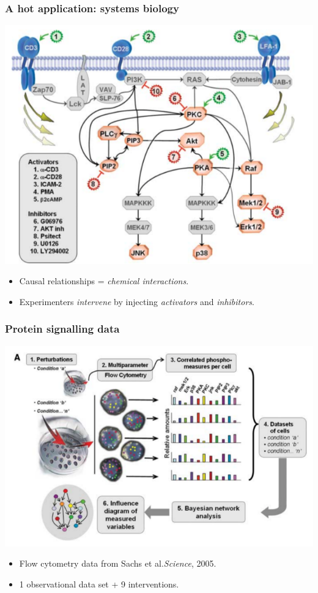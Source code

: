 \documentclass{beamer}
\begin{document}
\begin{frame}
\frametitle{A hot application: systems biology}
\begin{center}
\includegraphics[scale=0.3]{../images/cyto_graph.png}
\end{center}
\begin{itemize}
\item Causal relationships = \emph{chemical interactions}.
\item Experimenters \emph{intervene} by injecting \emph{activators} and \emph{inhibitors}.
\end{itemize}
\end{frame}

\begin{frame}
\frametitle{Protein signalling data}
\begin{center}
\includegraphics[scale=0.3]{../images/cytoA.png}
\end{center}
\begin{itemize}
\item Flow cytometry data from Sachs et al.\emph{Science}, 2005.
\item 1 observational data set + 9 interventions.
\end{itemize}
\end{frame}
\end{document}
